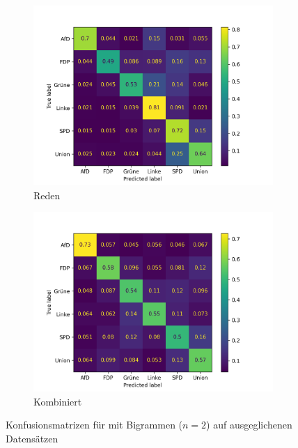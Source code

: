 \begin{figure}[H]
\begin{subfigure}{0.49\textwidth}
    \includegraphics[width=\textwidth]{data/images/modeling/fasttext/under/speeches_confusion_matrix.png}
    \caption{Reden} \label{sfig:confusionMatrixFastTextSpeeches}
  \end{subfigure}
  \hfill
  \begin{subfigure}{0.49\textwidth}
    \includegraphics[width=\textwidth]{data/images/modeling/fasttext/under/all_confusion_matrix.png}
    \caption{Kombiniert} \label{sfig:confusionMatrixFastTextAll}
  \end{subfigure}
  \caption{Konfusionsmatrizen für \ft mit Bigrammen (\(n = \num{2}\)) auf ausgeglichenen Datensätzen} \label{fig:confusionMatrixFastText}
\end{figure}

